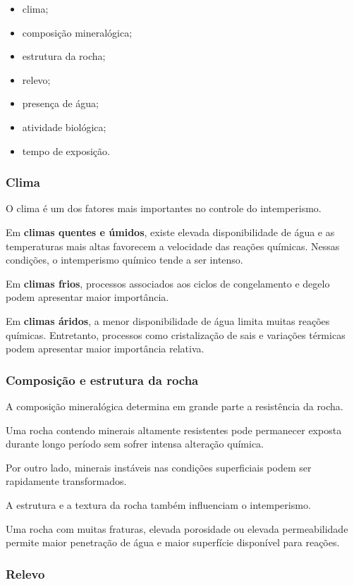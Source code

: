 \begin{itemize}
    \item clima;
    \item composição mineralógica;
    \item estrutura da rocha;
    \item relevo;
    \item presença de água;
    \item atividade biológica;
    \item tempo de exposição.
\end{itemize}

\subsubsection{Clima}

O clima é um dos fatores mais importantes no controle do intemperismo.

Em \textbf{climas quentes e úmidos}, existe elevada disponibilidade de água e as temperaturas mais altas favorecem a velocidade das reações químicas. Nessas condições, o intemperismo químico tende a ser intenso.

Em \textbf{climas frios}, processos associados aos ciclos de congelamento e degelo podem apresentar maior importância.

Em \textbf{climas áridos}, a menor disponibilidade de água limita muitas reações químicas. Entretanto, processos como cristalização de sais e variações térmicas podem apresentar maior importância relativa.

\subsubsection{Composição e estrutura da rocha}

A composição mineralógica determina em grande parte a resistência da rocha.

Uma rocha contendo minerais altamente resistentes pode permanecer exposta durante longo período sem sofrer intensa alteração química.

Por outro lado, minerais instáveis nas condições superficiais podem ser rapidamente transformados.

A estrutura e a textura da rocha também influenciam o intemperismo.

Uma rocha com muitas fraturas, elevada porosidade ou elevada permeabilidade permite maior penetração de água e maior superfície disponível para reações.

\subsubsection{Relevo}

